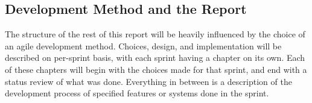 \subsection{Development Method and the Report}

The structure of the rest of this report will be heavily influenced by the choice of an agile development method. Choices, design, and implementation will be described on per-sprint basis, with each sprint having a chapter on its own. Each of these chapters will begin with the choices made for that sprint, and end with a status review of what was done. Everything in between is a description of the development process of specified features or systems done in the sprint.
